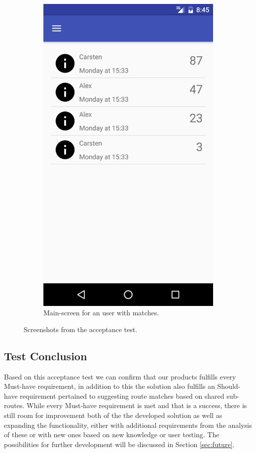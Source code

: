 \begin{figure}[ht!]
\begin{subfigure}[b]{0.24\textwidth}
        \includegraphics[width=\textwidth]{figures/s4test/testmain.png}
        \caption{Main-screen for an user with matches.}
        \label{s4tp:testmain}
\end{subfigure}
\caption{Screenshots from the acceptance test.}
\end{figure}

\subsection{Test Conclusion}
Based on this acceptance test we can confirm that our products fulfills every Must-have requirement, in addition to this the solution also fulfills an Should-have requirement pertained to suggesting route matches based on shared sub-routes. 
While every Must-have requirement is met and that is a success, there is still room for improvement both of the the developed solution as well as expanding the functionality, either with additional requirements from the analysis of these or with new ones based on new knowledge or user testing. 
The possibilities for further development will be discussed in Section \ref{sec:future}.

